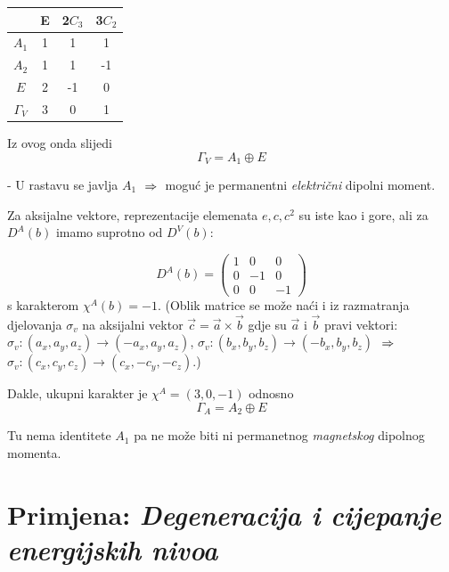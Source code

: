\begin{primjer}
\begin{tabular}{c|ccc}
  & E & 2$C_3$  & 3$C_2$ \\ \hline
$A_1$ & 1 & 1& 1 \\
$A_2$ & 1 & 1&-1 \\
 $E$  & 2 &-1& 0 \\ \hline
 $\Gamma_V$ & 3 & 0 & 1
\end{tabular}

Iz ovog onda slijedi
\begin{displaymath}
   \Gamma_{V} = A_1  \oplus E
\end{displaymath}

- U rastavu se javlja $A_1$ $\;\Rightarrow\;$ moguć je permanentni \emph{električni}
 dipolni
moment.


Za aksijalne vektore, reprezentacije elemenata $e, c, c^2$ su iste kao i
gore, ali za $D^{A}(b)$ imamo suprotno od $D^{V}(b)$:

\begin{displaymath}
D^{A}(b)=
\left(
\begin{array}{ccc}
1 & 0 & 0 \\
0 & -1 & 0 \\
0 & 0 & -1
\end{array}\right) 
\end{displaymath}
s karakterom $\chi^{A}(b)=-1$.
(Oblik matrice se može naći i iz razmatranja djelovanja $\sigma_{v}$ na
aksijalni vektor $\vec{c}=\vec{a}\times\vec{b}$ gdje 
su $\vec{a}$ i $\vec{b}$ pravi
vektori: $\sigma_{v}:(a_x, a_y, a_z)\to (-a_x, a_y, a_z)$,
 $\sigma_{v}:(b_x, b_y, b_z)\to (-b_x, b_y, b_z)$
$\;\Rightarrow\;$  $\sigma_{v}:(c_x, c_y, c_z)\to (c_x, -c_y, -c_z)$.)

Dakle, ukupni karakter je $\chi^{A}=(3, 0, -1)$ odnosno
\begin{displaymath}
      \Gamma_{A} = A_2 \oplus E
\end{displaymath}

Tu nema identitete $A_1$ pa ne može biti ni permanetnog \emph{magnetskog}
dipolnog momenta.
\end{primjer}

\section{Primjena: \emph{Degeneracija i cijepanje energijskih nivoa}}
\label{degeneracija}

